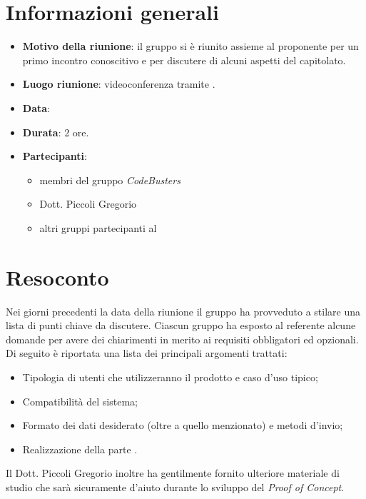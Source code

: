 \section{Informazioni generali}
\begin{itemize}
\item \textbf{Motivo della riunione}: il gruppo si è riunito assieme al proponente per un primo incontro conoscitivo e per discutere di alcuni aspetti del capitolato.
\item \textbf{Luogo riunione}: videoconferenza tramite .
\item \textbf{Data}: \Data{}
\item \textbf{Durata}: 2 ore.
\item \textbf{Partecipanti}:
	\begin{itemize}
	\item membri del gruppo \textit{CodeBusters}
	\item Dott. Piccoli Gregorio
	\item altri gruppi partecipanti al 
	\end{itemize}
\end{itemize}

\section{Resoconto}
Nei giorni precedenti la data della riunione il gruppo ha provveduto a stilare una lista di punti chiave da discutere. Ciascun gruppo ha esposto al referente alcune domande per avere dei chiarimenti in merito ai requisiti obbligatori ed opzionali. Di seguito è riportata una lista dei principali argomenti trattati:
\begin{itemize}

\item Tipologia di utenti che utilizzeranno il prodotto e caso d'uso tipico;

\item Compatibilità del sistema;

\item Formato dei dati desiderato (oltre a quello menzionato) e metodi d'invio;

\item Realizzazione della parte .

\end{itemize}

Il Dott. Piccoli Gregorio inoltre ha gentilmente fornito ulteriore materiale di studio che sarà sicuramente d'aiuto durante lo sviluppo del \textit{Proof of Concept}.